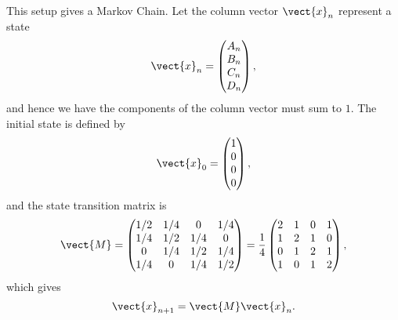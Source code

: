 \Question{\currfilebase}

This setup gives a Markov Chain. Let the column vector \(\vect{x}_n\) represent a state
\[
    \vect{x}_n = \begin{pmatrix}
        A_n \\
        B_n \\
        C_n \\
        D_n
    \end{pmatrix},
\]
and hence we have the components of the column vector must sum to \(1\). The initial state is defined by
\[
    \vect{x}_0 = \begin{pmatrix}
        1 \\
        0 \\
        0 \\
        0
    \end{pmatrix},
\]
and the state transition matrix is
\[
    \vect{M} = \begin{pmatrix}
        1/2 & 1/4 & 0   & 1/4 \\
        1/4 & 1/2 & 1/4 & 0   \\
        0   & 1/4 & 1/2 & 1/4 \\
        1/4 & 0   & 1/4 & 1/2
    \end{pmatrix}
    = \frac{1}{4} \begin{pmatrix}
        2 & 1 & 0 & 1 \\
        1 & 2 & 1 & 0 \\
        0 & 1 & 2 & 1 \\
        1 & 0 & 1 & 2
    \end{pmatrix},
\]
which gives
\[
    \vect{x}_{n + 1} = \vect{M} \vect{x}_{n}.
\]

